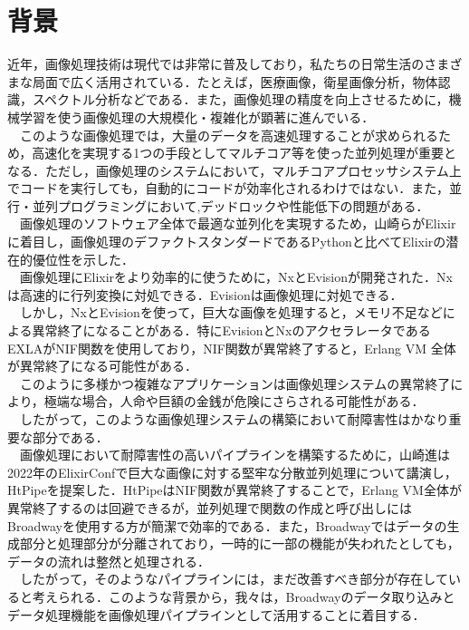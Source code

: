 \documentclass[a4paper]{jreport}	%
\begin{document}
\section{背景}
近年，画像処理技術は現代では非常に普及しており，私たちの日常生活のさまざまな局面で広く活用されている．たとえば，医療画像，衛星画像分析，物体認識，スペクトル分析などである．また，画像処理の精度を向上させるために，機械学習を使う画像処理の大規模化・複雑化が顕著に進んでいる\cite{A}．
\\　このような画像処理では，大量のデータを高速処理することが求められるため，高速化を実現する1つの手段としてマルチコア等を使った並列処理が重要となる．ただし，画像処理のシステムにおいて，マルチコアプロセッサシステム上でコードを実行しても，自動的にコードが効率化されるわけではない．また，並行・並列プログラミングにおいて,デッドロックや性能低下の問題がある\cite{B}．
\\　画像処理のソフトウェア全体で最適な並列化を実現するため，山崎らがElixirに着目し，画像処理のデファクトスタンダードであるPythonと比べてElixirの潜在的優位性を示した\cite{C}．
\\　画像処理にElixirをより効率的に使うために，NxとEvisionが開発された．Nxは高速的に行列変換に対処できる．Evisionは画像処理に対処できる．
\\　しかし，NxとEvisionを使って，巨大な画像を処理すると，メモリ不足などによる異常終了になることがある．特にEvisionとNxのアクセラレータであるEXLAがNIF関数を使用しており，NIF関数が異常終了すると，Erlang VM 全体が異常終了になる可能性がある．
\\　このように多様かつ複雑なアプリケーションは画像処理システムの異常終了により，極端な場合，人命や巨額の金銭が危険にさらされる可能性がある．
\\　したがって，このような画像処理システムの構築において耐障害性はかなり重要な部分である．
\\　画像処理において耐障害性の高いパイプラインを構築するために，山崎進は2022年のElixirConfで巨大な画像に対する堅牢な分散並列処理について講演し，HtPipeを提案した\cite{E}．HtPipeはNIF関数が異常終了することで，Erlang VM全体が異常終了するのは回避できるが，並列処理で関数の作成と呼び出しにはBroadwayを使用する方が簡潔で効率的である．また，Broadwayではデータの生成部分と処理部分が分離されており，一時的に一部の機能が失われたとしても，データの流れは整然と処理される．
\\　したがって，そのようなパイプラインには，まだ改善すべき部分が存在していると考えられる．このような背景から，我々は，Broadwayのデータ取り込みとデータ処理機能を画像処理パイプラインとして活用することに着目する．
\end{document}
